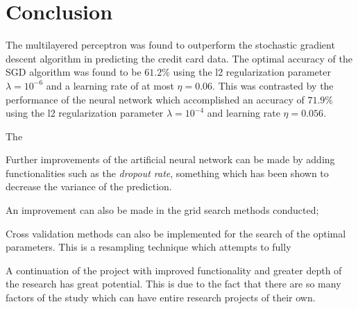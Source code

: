 \section{Conclusion}
	The multilayered perceptron was found to outperform the stochastic gradient descent algorithm in predicting the credit card data. The optimal accuracy of the SGD algorithm was found to be $61.2\%$ using the l2 regularization parameter $\lambda=10^{-6}$ and a learning rate of at most $\eta=0.06$. This was contrasted by the performance of the neural network which accomplished an accuracy of $71.9\%$ using the l2 regularization parameter $\lambda=10^{-4}$ and learning rate $\eta=0.056$.
	
	The 
	
  	Further improvements of the artificial neural network can be made by adding functionalities such as the \textit{dropout rate}, something which has been shown to decrease the variance of the prediction. 
  	
  	An improvement can also be made in the grid search methods conducted; 
  	
  	Cross validation methods can also be implemented for the search of the optimal parameters. This is a resampling technique which attempts to fully 
  	
  	A continuation of the project with improved functionality and greater depth of the research has great potential. This is due to the fact that there are so many factors of the study which can have entire research projects of their own.
  	